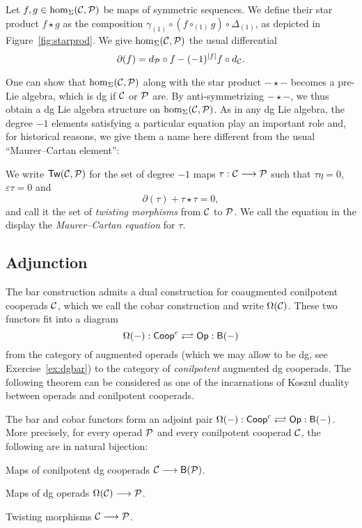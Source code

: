 \begin{definition}
Let $f,g\in \hom_\Sigma(\mathcal{C},{\mathcal{P}})$ be maps of symmetric
sequences. We define their star product $f\star g$ 
as the composition
$\gamma_{(1)} \circ (f\circ_{(1)} g)\circ \Delta_{(1)}$,
as depicted in Figure~\ref{fig:starprod}. We give 
$\hom_\Sigma(\mathcal{C},{\mathcal{P}})$ the usual differential
\[
\partial(f) = d_{\mathcal{P}} \circ f  - (-1)^{|f|} f\circ d_{\mathcal{C}}.
\]
\end{definition}

One can show that $\hom_\Sigma(\mathcal{C},{\mathcal{P}})$ along with
the star product $-\star -$ becomes a pre-Lie algebra,
 which is dg if $\mathcal{C}$ or ${\mathcal{P}}$ are. By anti-symmetrizing
 $-\star -$, we thus obtain a dg Lie algebra structure
 on $\hom_\Sigma(\mathcal{C},{\mathcal{P}})$. As in any dg Lie algebra,
 the degree $-1$ elements satisfying a particular equation
 play an important role and, for historical reasons,
  we give them a name here 
 different from the usual ``Maurer--Cartan element'':
 
\begin{definition}
We write $\mathsf{Tw}(\mathcal{C},{\mathcal{P}})$ for the set of degree $-1$ maps
$\tau : \mathcal{C}\longrightarrow {\mathcal{P}}$
such that $\tau\eta =0$, $\varepsilon\tau = 0$
and 
\[
\partial(\tau) + \tau\star \tau = 0,
\]
and call it the set of \emph{twisting morphisms} from
$\mathcal{C}$ to ${\mathcal{P}}$. We call the equation in the display the
\emph{Maurer--Cartan equation} for $\tau$.
\end{definition}


\subsection{Adjunction}
The bar construction admits a dual construction for
coaugmented conilpotent cooperads $\mathcal{C}$, which we call
the cobar construction and write $\Omega(\mathcal{C})$. These
two functors fit into a diagram
\[
 \Omega(-)  : \mathsf{Coop}^c   \adjoint
  \mathsf{Op} :\B{-}
\]
from the category of augmented operads (which we may allow to be
dg, see Exercise~\ref{ex:dgbar}) to the category of
\emph{conilpotent} augmented dg cooperads. The following
theorem can be considered as one of the incarnations of Koszul
duality between operads and conilpotent cooperads.

\begin{theorem}\label{thm:adjunction}
The bar and cobar functors form an adjoint pair
$ \Omega(-)  : \mathsf{Coop}^c   \adjoint
  \mathsf{Op} :\B{-}$.
More precisely, 
for every operad ${\mathcal{P}}$ and every conilpotent cooperad
$\mathcal{C}$, the following are in natural bijection:
\begin{tenumerate}
\item Maps of conilpotent dg cooperads $\mathcal{C} \longrightarrow \mathsf{B}({\mathcal{P}})$.
\item Maps of dg operads $\Omega(\mathcal{C}) \longrightarrow{\mathcal{P}}$.
\item Twisting morphisms $\mathcal{C} \longrightarrow {\mathcal{P}}$.
\end{tenumerate}
\end{theorem}

